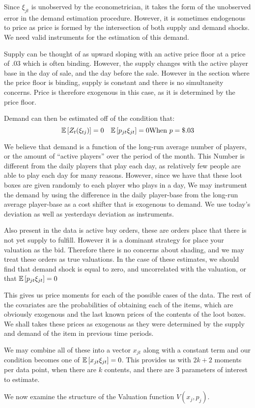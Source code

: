 \documentclass[12pt]{paper}
\begin{document}
Since $\xi_{jt}$ is unobserved by the econometrician, it takes the form
of the unobserved error in the demand estimation procedure. However,
it is sometimes endogenous to price as price is formed by the
intersection of both supply and demand shocks. We need valid
instruments for the estimation of this demand. 

Supply can be thought of as upward sloping with an active price floor
at a price of $.03$ which is often binding. However, the supply
changes with the active player base in the day of sale, and the day
before the sale. However in the section where the price floor is
binding, supply is constant and there is no simultaneity
concerns. Price is therefore exogenous in this case, as it is
determined by the price floor. 

Demand can then be estimated off of the condition that:
\begin{equation*}
  \mathbb{E} \left [ Z_t (\xi_{tj}) \right ] = 0 \quad \mathbb{E} \left [  p_{jt} \xi_{jt}  \right ] = 0 \text{When } p = \$.03
\end{equation*}

We believe that demand is a function of the long-run average number
of players, or the amount of ``active players'' over the period of the
month. This Number is different from the daily players that play each
day, as relatively few people are able to play each day for many
reasons. However, since we have that these loot boxes are given
randomly to each player who plays in a day, We may instrument the
demand by using the difference in the daily player-base from the
long-run average player-base as a cost shifter that is exogenous to
demand. We use today's deviation as well as yesterdays deviation as
instruments. 

Also present in the data is active buy orders, these are orders place
that there is not yet supply to fulfill. However it is a dominant
strategy for place your valuation as the bid. Therefore there is no
concerns about shading, and we may treat these orders as true
valuations. In the case of these estimates, we should find that demand
shock is equal to zero, and uncorrelated with the valuation, or that
$\mathbb{E} \left [ p_{jt}\xi_{jt} \right ] = 0$

This gives us price moments for each of the possible cases of the
data. The rest of the covariates are the probabilities of obtaining
each of the items, which are obviously exogenous and the last known
prices of the contents of the loot boxes. We shall takes these prices
as exogenous as they were determined by the supply and demand of the
item in previous time periods.

We may combine all of these into a vector $x_{jt}$ along with a
constant term and our condition becomes one of
$\mathbb{E} \left [ x_{jt}\xi_{jt} \right ] = 0$. This provides us with $2k + 2$ moments per
data point, when there are $k$ contents, and there are 3 parameters of
interest to estimate.

We now examine the structure of the Valuation function $V( x_j,
p_j)$.
\end{document}
